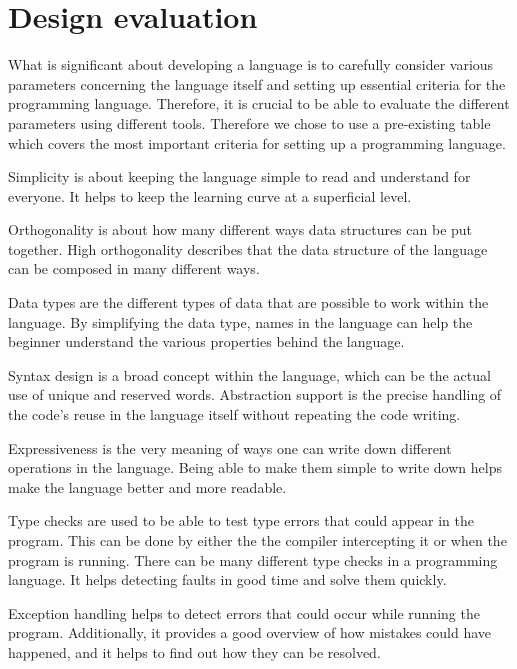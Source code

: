 \section{Design evaluation} \label{chap:design evaluation}
What is significant about developing a language is to carefully consider various parameters concerning the language itself and setting up essential criteria for the programming language. 
Therefore, it is crucial to be able to evaluate the different parameters using different tools. Therefore we chose to use a pre-existing table which covers the most important criteria for setting up a programming language. 




Simplicity is about keeping the language simple to read and understand for everyone. It helps to keep the learning curve at a superficial level.

Orthogonality is about how many different ways data structures can be put together. High orthogonality describes that the data structure of the language can be composed in many different ways.

Data types are the different types of data that are possible to work within the language. By simplifying the data type, names in the language can help the beginner understand the various properties behind the language.

Syntax design is a broad concept within the language, which can be the actual use of unique and reserved words.
Abstraction support is the precise handling of the code's reuse in the language itself without repeating the code writing.

Expressiveness is the very meaning of ways one can write down different operations in the language. Being able to make them simple to write down helps make the language better and more readable.

Type checks are used to be able to test type errors that could appear in the program. This can be done by either the the compiler intercepting it or when the program is running. There can be many different type checks in a programming language. It helps detecting faults in good time and solve them quickly.

Exception handling helps to detect errors that could occur while running the program. Additionally, it provides a good overview of how mistakes could have happened, and it helps to find out how they can be resolved.


